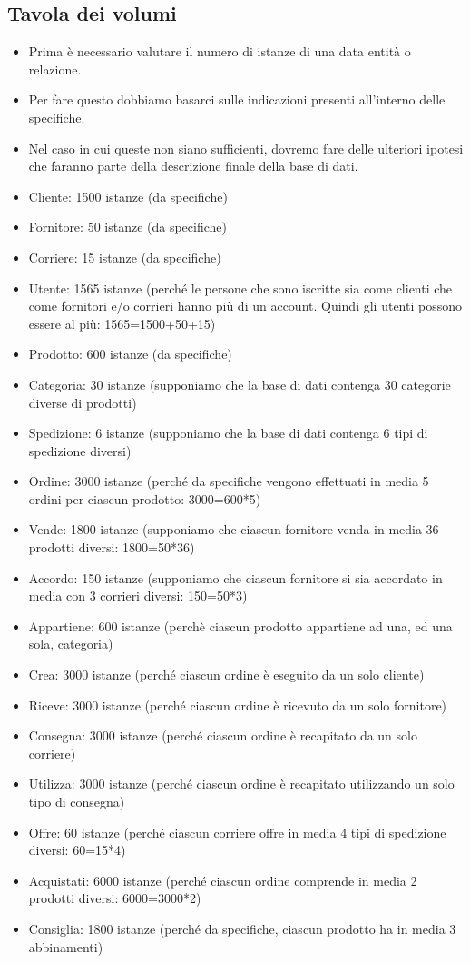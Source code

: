 \subsection{Tavola dei volumi}
\begin{itemize}
	\item Prima è necessario valutare il numero di istanze di una data entità o relazione. 
	\item Per fare questo dobbiamo basarci sulle indicazioni presenti all’interno delle specifiche. 
	\item Nel caso in cui queste non siano sufficienti, dovremo fare delle ulteriori ipotesi che faranno parte della descrizione finale della base di dati.\\
	\item Cliente: 1500 istanze (da specifiche) 
	\item Fornitore: 50 istanze (da specifiche) 
	\item Corriere: 15 istanze (da specifiche) 
	\item Utente: 1565 istanze (perché le persone che sono iscritte sia come clienti che come fornitori e/o corrieri
	hanno più di un account. Quindi gli utenti possono essere al più: 1565=1500+50+15) 
	\item Prodotto: 600 istanze (da specifiche) 
	\item Categoria: 30 istanze (supponiamo che la base di dati contenga 30 categorie diverse di prodotti) 
	\item Spedizione: 6 istanze (supponiamo che la base di dati contenga 6 tipi di spedizione diversi)
	\item Ordine: 3000 istanze (perché da specifiche vengono effettuati in media 5 ordini per ciascun prodotto: 3000=600*5) 
	\item Vende: 1800 istanze (supponiamo che ciascun fornitore venda in media 36 prodotti diversi: 1800=50*36) 
	\item Accordo: 150 istanze (supponiamo che ciascun fornitore si sia accordato in media con 3 corrieri diversi: 150=50*3) 
	\item Appartiene: 600 istanze (perchè ciascun prodotto appartiene ad una, ed una sola, categoria) 
	\item Crea: 3000 istanze (perché ciascun ordine è eseguito da un solo cliente) 
	\item Riceve: 3000 istanze (perché ciascun ordine è ricevuto da un solo fornitore)
	\item Consegna: 3000 istanze (perché ciascun ordine è recapitato da un solo corriere) 
	\item Utilizza: 3000 istanze (perché ciascun ordine è recapitato utilizzando un solo tipo di consegna) 
	\item Offre: 60 istanze (perché ciascun corriere offre in media 4 tipi di spedizione diversi: 60=15*4) 
	\item Acquistati: 6000 istanze (perché ciascun ordine comprende in media 2 prodotti diversi: 6000=3000*2) 
	\item Consiglia: 1800 istanze (perché da specifiche, ciascun prodotto ha in media 3 abbinamenti)
\end{itemize}
